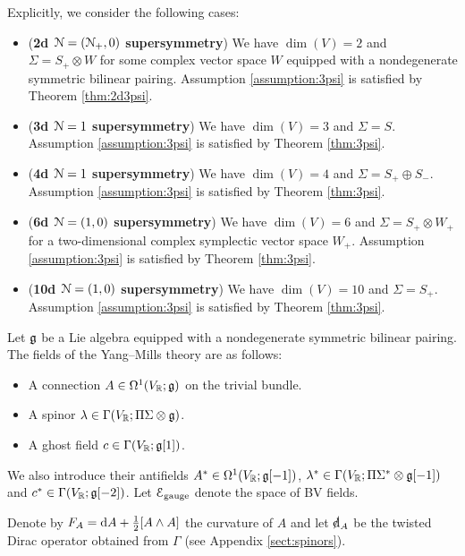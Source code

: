 \documentclass[10pt, oneside]{article}
\newcommand{\gauge}{\mathrm{gauge}}
\begin{document}
Explicitly, we consider the following cases:
\begin{itemize}
\item (\textbf{2d $\mathcal N=(\mathcal N_+, 0)$ supersymmetry}) We have $\dim(V) = 2$ and $\Sigma = S_+\otimes W$ for some complex vector space $W$ equipped with a nondegenerate symmetric bilinear pairing. Assumption \ref{assumption:3psi} is satisfied by Theorem \ref{thm:2d3psi}.

\item (\textbf{3d $\mathcal N=1$ supersymmetry}) We have $\dim(V) = 3$ and $\Sigma = S$. Assumption \ref{assumption:3psi} is satisfied by Theorem \ref{thm:3psi}.

\item (\textbf{4d $\mathcal N=1$ supersymmetry}) We have $\dim(V) = 4$ and $\Sigma = S_+\oplus S_-$. Assumption \ref{assumption:3psi} is satisfied by Theorem \ref{thm:3psi}.

\item (\textbf{6d $\mathcal N=(1, 0)$ supersymmetry}) We have $\dim(V) = 6$ and $\Sigma = S_+\otimes W_+$ for a two-dimensional complex symplectic vector space $W_+$. Assumption \ref{assumption:3psi} is satisfied by Theorem \ref{thm:3psi}.

\item (\textbf{10d $\mathcal N=(1, 0)$ supersymmetry}) We have $\dim(V) = 10$ and $\Sigma = S_+$. Assumption \ref{assumption:3psi} is satisfied by Theorem \ref{thm:3psi}.
\end{itemize}

Let $\mathfrak g$ be a Lie algebra equipped with a nondegenerate symmetric bilinear pairing. The fields of the Yang--Mills theory are as follows:
\begin{itemize}
\item A connection $A \in \Omega^1(V_\mathbb R; \mathfrak g)$ on the trivial bundle.

\item A spinor $\lambda \in \Gamma(V_\mathbb R; \Pi \Sigma \otimes \mathfrak g)$.

\item A ghost field $c\in\Gamma(V_\mathbb R; \mathfrak g[1])$.
\end{itemize}

We also introduce their antifields $A^*\in\Omega^1(V_\mathbb R; \mathfrak g[-1])$, $\lambda^*\in\Gamma(V_\mathbb R; \Pi\Sigma^*\otimes \mathfrak g[-1])$ and $c^*\in\Gamma(V_\mathbb R; \mathfrak g[-2])$. Let $\cE_{\gauge}$ denote the space of BV fields. 

Denote by $F_A = {\rm d} A + \frac{1}{2}[A\wedge A]$ the curvature of $A$ and let $\sd\d_A$ be the twisted Dirac operator obtained from $\Gamma$ (see Appendix \ref{sect:spinors}).
\end{document}
